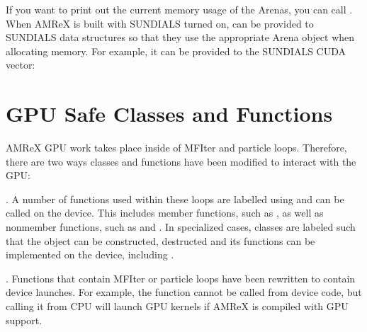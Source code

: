 \documentclass[letterpaper,10pt,english]{sphinxmanual}
\begin{document}
\sphinxAtStartPar
If you want to print out the current memory usage
of the Arenas, you can call .
When AMReX is built with SUNDIALS turned on, 
can be provided to SUNDIALS data structures so that they use the appropriate
Arena object when allocating memory. For example, it can be provided to the
SUNDIALS CUDA vector:

\begin{sphinxVerbatim}[commandchars=\\\{\}]
     
\end{sphinxVerbatim}


\section{GPU Safe Classes and Functions}
\label{\detokenize{GPU:gpu-safe-classes-and-functions}}\label{\detokenize{GPU:sec-gpu-classes}}
\sphinxAtStartPar
AMReX GPU work takes place inside of MFIter and particle loops.
Therefore, there are two ways classes and functions have been modified
to interact with the GPU:

. A number of functions used within these loops are labelled using
 and can be called on the device. This includes member
functions, such as , as well as non\sphinxhyphen{}member functions,
such as  and . In specialized cases,
classes are labeled such that the object can be constructed, destructed
and its functions can be implemented on the device, including .

. Functions that contain MFIter or particle loops have been rewritten
to contain device launches. For example, the 
function cannot be called from device code, but calling it from
CPU will launch GPU kernels if AMReX is compiled with GPU support.
\end{document}
